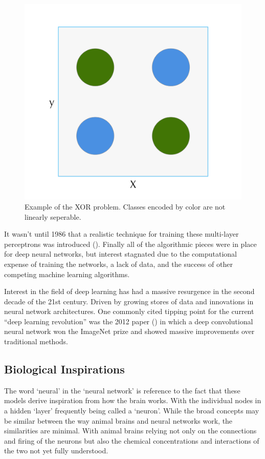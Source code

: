 \documentclass[]{book}
\theoremstyle{definition}
\theoremstyle{definition}
\theoremstyle{definition}
\theoremstyle{remark}
\begin{document}
\begin{figure}

{\centering \includegraphics[width=0.5\linewidth]{figures/xor_problem} 

}

\caption{Example of the XOR problem. Classes encoded by color are not linearly seperable.}\label{fig:xorproble}
\end{figure}

It wasn't until 1986 that a realistic technique for training these
multi-layer perceptrons was introduced (\citet{backprop_1986}). Finally
all of the algorithmic pieces were in place for deep neural networks,
but interest stagnated due to the computational expense of training the
networks, a lack of data, and the success of other competing machine
learning algorithms.

Interest in the field of deep learning has had a massive resurgence in
the second decade of the 21st century. Driven by growing stores of data
and innovations in neural network architectures. One commonly cited
tipping point for the current ``deep learning revolution'' was the 2012
paper (\citet{imagenet_2012}) in which a deep convolutional neural
network won the ImageNet prize and showed massive improvements over
traditional methods.

\subsection{Biological Inspirations}\label{biological-inspirations}

The word `neural' in the `neural network' is reference to the fact that
these models derive inspiration from how the brain works. With the
individual nodes in a hidden `layer' frequently being called a `neuron'.
While the broad concepts may be similar between the way animal brains
and neural networks work, the similarities are minimal. With animal
brains relying not only on the connections and firing of the neurons but
also the chemical concentrations and interactions of the two not yet
fully understood.
\end{document}
